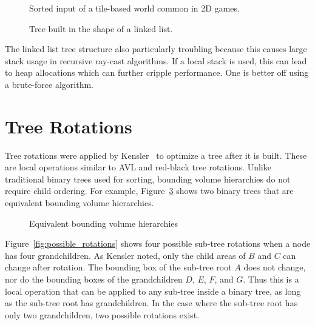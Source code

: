\documentclass{article}
\begin{document}
\begin{figure}
	\begin{center}
		
	\end{center}
	\caption{Sorted input of a tile-based world common in 2D games.}
	\label{fig:tile_based}
\end{figure}

\begin{figure}
	\begin{center}
		
	\end{center}
	\caption{Tree built in the shape of a linked list.}
	\label{fig:linked_list}
\end{figure}

The linked list tree structure also particularly troubling because this causes large stack usage in recursive ray-cast algorithms. If a local stack is used, this can lead to heap allocations which can further cripple performance. One is better off using a brute-force algorithm.

\section{Tree Rotations}
Tree rotations were applied by Kensler~\cite{Kensler2008} to optimize a tree after it is built. These are local operations similar to AVL and red-black tree rotations. Unlike traditional binary trees used for sorting, bounding volume hierarchies do not require child ordering. For example, Figure~\ref{fig:equivalent_trees} shows two binary trees that are equivalent bounding volume hierarchies.

\begin{figure}
	\begin{center}
		
	\end{center}
	\caption{Equivalent bounding volume hierarchies}
	\label{fig:equivalent_trees}
\end{figure}

Figure~\ref{fig:possible_rotations} shows four possible sub-tree rotations when a node has four grandchildren. As Kensler noted, only the child areas of $B$ and $C$ can change after rotation. The bounding box of the sub-tree root $A$ does not change, nor do the bounding boxes of the grandchildren $D$, $E$, $F$, and $G$. Thus this is a local operation that can be applied to any sub-tree inside a binary tree, as long as the sub-tree root has grandchildren. In the case where the sub-tree root has only two grandchildren, two possible rotations exist.
\end{document}
